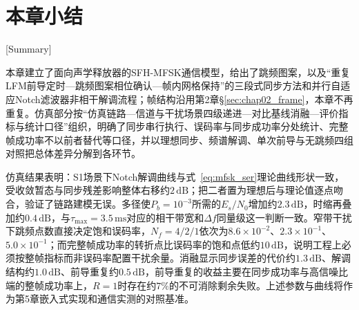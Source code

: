 \section{本章小结}[Summary]

本章建立了面向声学释放器的SFH-MFSK通信模型，给出了跳频图案，以及“重复LFM前导定时—跳频图案相位确认—帧内网格保持”的三段式同步方法和并行自适应Notch滤波器非相干解调流程；帧结构沿用第2章\S\ref{sec:chap02_frame}，本章不再重复。仿真部分按“仿真链路—信道与干扰场景四级递进—对比基线消融—评价指标与统计口径”组织，明确了同步串行执行、误码率与同步成功率分处统计、完整帧成功率不以前者替代等口径，并以理想同步、频谱解调、单次前导与无跳频四组对照把总体差异分解到各环节。

仿真结果表明：S1场景下Notch解调曲线与式~\eqref{eq:mfsk_ser}理论曲线形状一致，受收敛暂态与同步残差影响整体右移约$2\,\mathrm{dB}$；把二者置为理想后与理论值逐点吻合，验证了链路建模无误。多径使$P_b=10^{-3}$所需的$E_s/N_0$增加约$2.3\,\mathrm{dB}$，时缩再叠加约$0.4\,\mathrm{dB}$，与$\tau_{\max}=3.5\,\mathrm{ms}$对应的相干带宽和$\Delta f$同量级这一判断一致。窄带干扰下跳频点数直接决定饱和误码率，$N_f=4/2/1$依次为$8.6\times10^{-2}$、$2.3\times10^{-1}$、$5.0\times10^{-1}$；而完整帧成功率的转折点比误码率的饱和点低约$10\,\mathrm{dB}$，说明工程上必须按整帧指标而非误码率配置干扰余量。消融显示同步误差的代价约$1.3\,\mathrm{dB}$、解调结构约$1.0\,\mathrm{dB}$、前导重复约$0.5\,\mathrm{dB}$，前导重复的收益主要在同步成功率与高信噪比端的整帧成功率上，$R=1$时存在约$7\%$的不可消除剩余失败。上述参数与曲线将作为第5章嵌入式实现和通信实测的对照基准。






